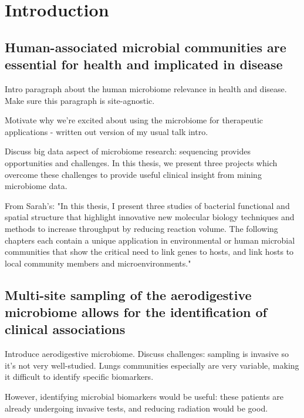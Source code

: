 
\chapter{Introduction}

\section{Human-associated microbial communities are essential for health and implicated in disease}

Intro paragraph about the human microbiome relevance in health and disease. Make sure this paragraph is site-agnostic.

Motivate why we're excited about using the microbiome for therapeutic applications - written out version of my usual talk intro.

Discuss big data aspect of microbiome research: sequencing provides opportunities and challenges. In this thesis, we present three projects which overcome these challenges to provide useful clinical insight from mining microbiome data.

From Sarah's: "In this thesis, I present three studies of bacterial functional and spatial structure that highlight innovative new molecular biology techniques and methods to increase throughput by reducing reaction volume. The following chapters each contain a unique application in environmental or human microbial communities that show the critical need to link genes to hosts, and link hosts to local community members and microenvironments."

\section{Multi-site sampling of the aerodigestive microbiome allows for the identification of clinical associations}

Introduce aerodigestive microbiome. Discuss challenges: sampling is invasive so it's not very well-studied. Lungs communities especially are very variable, making it difficult to identify specific biomarkers.

However, identifying microbial biomarkers would be useful: these patients are already undergoing invasive tests, and reducing radiation would be good.

